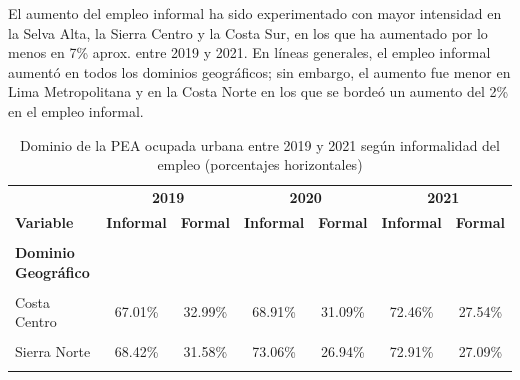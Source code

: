 \documentclass[
  letterpaper,
  12pt,
  oneside,
  spanish,
  doublespacing,
  headsepline,
  parskip]{MastersDoctoralThesis}
\begin{document}
El aumento del empleo informal ha sido experimentado con mayor
intensidad en la Selva Alta, la Sierra Centro y la Costa Sur, en los que
ha aumentado por lo menos en 7\% aprox. entre 2019 y 2021. En líneas
generales, el empleo informal aumentó en todos los dominios geográficos;
sin embargo, el aumento fue menor en Lima Metropolitana y en la Costa
Norte en los que se bordeó un aumento del 2\% en el empleo informal.

\hypertarget{tbl-dominio}{}
\begin{table}[H]
\caption{\label{tbl-dominio}Dominio de la PEA ocupada urbana entre 2019 y 2021 según informalidad
del empleo (porcentajes horizontales) }\tabularnewline

\centering\begingroup\fontsize{10}{12}\selectfont

\begin{tabular}{lcccccc}
\toprule
\multicolumn{1}{c}{ } & \multicolumn{2}{c}{\textbf{2019}} & \multicolumn{2}{c}{\textbf{2020}} & \multicolumn{2}{c}{\textbf{2021}} \\
\cmidrule(l{3pt}r{3pt}){2-3} \cmidrule(l{3pt}r{3pt}){4-5} \cmidrule(l{3pt}r{3pt}){6-7}
\textbf{Variable} & \textbf{Informal} & \textbf{Formal} & \textbf{Informal} & \textbf{Formal} & \textbf{Informal} & \textbf{Formal}\\
\midrule
\cellcolor{gray!6}{\textbf{Nacional}} & \cellcolor{gray!6}{66.40\%} & \cellcolor{gray!6}{33.60\%} & \cellcolor{gray!6}{68.42\%} & \cellcolor{gray!6}{31.58\%} & \cellcolor{gray!6}{71.41\%} & \cellcolor{gray!6}{28.59\%}\\
\textbf{Dominio Geográfico} &  &  &  &  &  & \\
\cellcolor{gray!6}{Costa Norte} & \cellcolor{gray!6}{72.53\%} & \cellcolor{gray!6}{27.47\%} & \cellcolor{gray!6}{72.42\%} & \cellcolor{gray!6}{27.58\%} & \cellcolor{gray!6}{74.56\%} & \cellcolor{gray!6}{25.44\%}\\
Costa Centro & 67.01\% & 32.99\% & 68.91\% & 31.09\% & 72.46\% & 27.54\%\\
\cellcolor{gray!6}{Costa Sur} & \cellcolor{gray!6}{68.12\%} & \cellcolor{gray!6}{31.88\%} & \cellcolor{gray!6}{67.92\%} & \cellcolor{gray!6}{32.08\%} & \cellcolor{gray!6}{73.02\%} & \cellcolor{gray!6}{26.98\%}\\
\addlinespace
Sierra Norte & 68.42\% & 31.58\% & 73.06\% & 26.94\% & 72.91\% & 27.09\%\\
\cellcolor{gray!6}{Sierra Centro} & \cellcolor{gray!6}{73.02\%} & \cellcolor{gray!6}{26.98\%} & \cellcolor{gray!6}{75.78\%} & \cellcolor{gray!6}{24.22\%} & \cellcolor{gray!6}{80.20\%} & \cellcolor{gray!6}{19.80\%}\\

\end{tabular}
\end{table}
\end{document}
